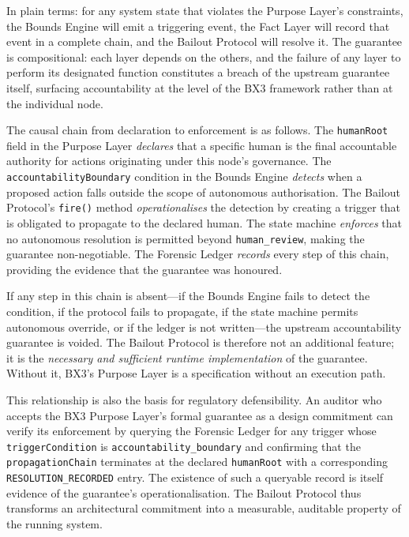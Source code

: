 In plain terms: for any system state that violates the Purpose Layer's constraints, the Bounds Engine will emit a triggering event, the Fact Layer will record that event in a complete chain, and the Bailout Protocol will resolve it. The guarantee is compositional: each layer depends on the others, and the failure of any layer to perform its designated function constitutes a breach of the upstream guarantee itself, surfacing accountability at the level of the BX3 framework rather than at the individual node.

The causal chain from declaration to enforcement is as follows. The \texttt{humanRoot} field in the Purpose Layer \emph{declares} that a specific human is the final accountable authority for actions originating under this node's governance. The \texttt{accountabilityBoundary} condition in the Bounds Engine \emph{detects} when a proposed action falls outside the scope of autonomous authorisation. The Bailout Protocol's \texttt{fire()} method \emph{operationalises} the detection by creating a trigger that is obligated to propagate to the declared human. The state machine \emph{enforces} that no autonomous resolution is permitted beyond \texttt{human\_review}, making the guarantee non-negotiable. The Forensic Ledger \emph{records} every step of this chain, providing the evidence that the guarantee was honoured.

If any step in this chain is absent---if the Bounds Engine fails to detect the condition, if the protocol fails to propagate, if the state machine permits autonomous override, or if the ledger is not written---the upstream accountability guarantee is voided. The Bailout Protocol is therefore not an additional feature; it is the \emph{necessary and sufficient runtime implementation} of the guarantee. Without it, BX3's Purpose Layer is a specification without an execution path.

This relationship is also the basis for regulatory defensibility. An auditor who accepts the BX3 Purpose Layer's formal guarantee as a design commitment can verify its enforcement by querying the Forensic Ledger for any trigger whose \texttt{triggerCondition} is \texttt{accountability\_boundary} and confirming that the \texttt{propagationChain} terminates at the declared \texttt{humanRoot} with a corresponding \texttt{RESOLUTION\_RECORDED} entry. The existence of such a queryable record is itself evidence of the guarantee's operationalisation. The Bailout Protocol thus transforms an architectural commitment into a measurable, auditable property of the running system.